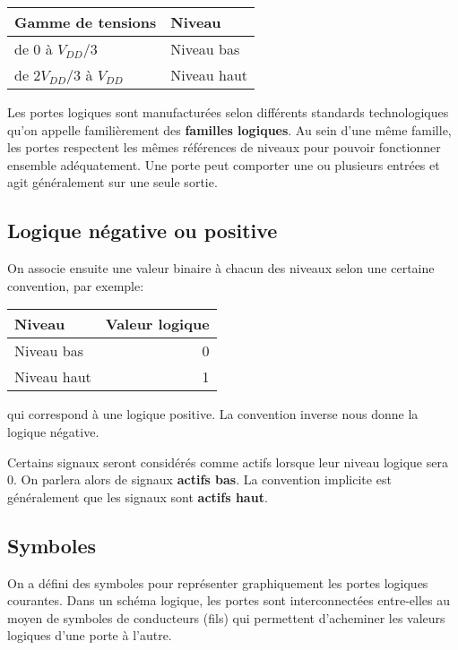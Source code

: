 \documentclass[11pt]{article}
\begin{document}
\begin{center}
\begin{tabular}{ll}
Gamme de tensions & Niveau\\
\hline
de 0 à  \(V_{DD}/3\) & Niveau bas\\
de \(2V_{DD}/3\) à  \(V_{DD}\) & Niveau haut\\
\end{tabular}
\end{center}

Les portes logiques sont manufacturées selon différents standards
technologiques qu'on appelle familièrement des \textbf{familles logiques}. Au
sein d'une même famille, les portes respectent les mêmes références de
niveaux pour pouvoir fonctionner ensemble adéquatement. Une porte peut
comporter une ou plusieurs entrées et agit généralement sur une seule
sortie.

\subsection{Logique négative ou positive}
\label{sec:org38bd1e8}

On associe ensuite une valeur binaire à chacun des niveaux selon une
certaine convention, par exemple:
\begin{center}
\begin{tabular}{lr}
Niveau & Valeur logique\\
\hline
Niveau bas & 0\\
Niveau haut & 1\\
\end{tabular}
\end{center}
qui correspond à une logique positive. La convention inverse nous
donne la logique négative.

Certains signaux seront considérés comme actifs lorsque leur niveau
logique sera 0. On parlera alors de signaux \textbf{actifs bas}. La
convention implicite est généralement que les signaux sont \textbf{actifs
haut}.

\subsection{Symboles}
\label{sec:orgeed89de}

On a défini des symboles pour représenter graphiquement les portes
logiques courantes. Dans un schéma logique, les portes sont
interconnectées entre-elles au moyen de symboles de conducteurs
(fils) qui permettent d'acheminer les valeurs logiques d'une porte à
l'autre.
\end{document}
